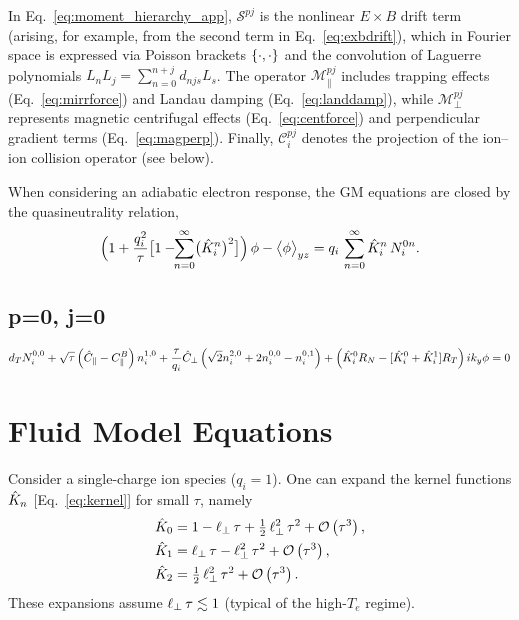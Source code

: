 \documentclass{article}
\begin{document}
In Eq.~\ref{eq:moment_hierarchy_app}, $\mathcal S^{pj}$ is the nonlinear  $E\times B$
drift term (arising, for example, from the second term in Eq.~\ref{eq:exbdrift}),
which in Fourier space is expressed via Poisson brackets $\left\{\cdot,\cdot\right\}$ 
and the convolution of Laguerre polynomials $L_nL_j=\sum_{n=0}^{n+j}d_{njs}L_s$. 
The operator $\mathcal M_{\parallel}^{pj}$ includes trapping effects 
(Eq.~\ref{eq:mirrforce}) and Landau damping (Eq.~\ref{eq:landdamp}), 
while $\mathcal M_{\perp}^{pj}$ represents magnetic centrifugal effects (Eq.~\ref{eq:centforce}) 
and perpendicular gradient terms (Eq.~\ref{eq:magperp}). 
Finally, $\mathcal C_i^{pj}$ denotes the projection of the ion--ion collision operator (see below).  
\par
When considering an adiabatic electron response, the GM equations are closed by the quasineutrality relation,
\begin{equation}
     \Bigl(1 + \frac{q_i^2}{\tau}\bigl[1-\!\!\sum_{n=0}^{\infty}\bigl(\hat K_{i}^n\bigr)^2\bigr]\Bigr)\,\phi  - \bigl\langle \phi \bigr\rangle_{y z} 
      =  q_i\,\sum_{n=0}^{\infty}\hat K_{i}^n\, N_i^{0n}.
    \label{ch5_eq:poisson_moments_adiabe}
\end{equation}

\subsection{p=0, j=0}
\[
d_T N_i^{0,0}  + \sqrt{\tau} \left( \hat{C}_{\parallel} - C^B_{\parallel} \right) n_i^{1,0}
+ \frac{\tau}{q_i} \hat{C}_{\perp} \left( \sqrt{2} n_i^{2,0} + 2 n_i^{0,0} - n_i^{0,1} \right)
+  \left( \hat K_i^0 R_N - [\hat K_i^0 + \hat K_i^1] R_T \right) i k_y  \phi = 0
\]


\section{Fluid Model Equations}

Consider a single-charge ion species ($q_i=1$). One can expand the kernel functions $\hat K_n$ [Eq.~\eqref{eq:kernel}] for small $\tau$, namely
\begin{align}
    \hat K_0  &=  1  - \ell_\perp\,\tau 
                  + \tfrac12\,\ell_\perp^2\,\tau^2  + \mathcal O\left(\tau^3\right),\\
    \hat K_1  &=  \ell_\perp\,\tau 
                  - \ell_\perp^2\,\tau^2 
                  + \mathcal O\left(\tau^3\right),\\    
    \hat K_2  &=  \tfrac12\,\ell_\perp^2\,\tau^2  + \mathcal O\left(\tau^3\right).
\end{align}
These expansions assume $\ell_\perp\,\tau \lesssim 1$ (typical of the high-$T_e$ regime).  
\end{document}
